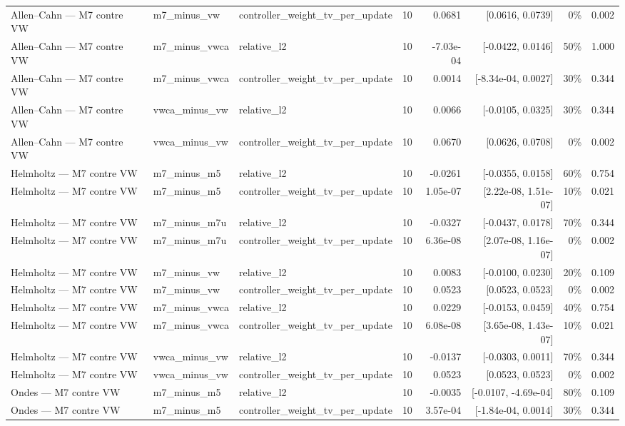 \begin{tabular}{llllrrrr}
Allen–Cahn — M7 contre VW & m7\_minus\_vw & controller\_weight\_tv\_per\_update & 10 & 0.0681 & [0.0616, 0.0739] & 0\% & 0.002 \\
Allen–Cahn — M7 contre VW & m7\_minus\_vwca & relative\_l2 & 10 & -7.03e-04 & [-0.0422, 0.0146] & 50\% & 1.000 \\
Allen–Cahn — M7 contre VW & m7\_minus\_vwca & controller\_weight\_tv\_per\_update & 10 & 0.0014 & [-8.34e-04, 0.0027] & 30\% & 0.344 \\
Allen–Cahn — M7 contre VW & vwca\_minus\_vw & relative\_l2 & 10 & 0.0066 & [-0.0105, 0.0325] & 30\% & 0.344 \\
Allen–Cahn — M7 contre VW & vwca\_minus\_vw & controller\_weight\_tv\_per\_update & 10 & 0.0670 & [0.0626, 0.0708] & 0\% & 0.002 \\
Helmholtz — M7 contre VW & m7\_minus\_m5 & relative\_l2 & 10 & -0.0261 & [-0.0355, 0.0158] & 60\% & 0.754 \\
Helmholtz — M7 contre VW & m7\_minus\_m5 & controller\_weight\_tv\_per\_update & 10 & 1.05e-07 & [2.22e-08, 1.51e-07] & 10\% & 0.021 \\
Helmholtz — M7 contre VW & m7\_minus\_m7u & relative\_l2 & 10 & -0.0327 & [-0.0437, 0.0178] & 70\% & 0.344 \\
Helmholtz — M7 contre VW & m7\_minus\_m7u & controller\_weight\_tv\_per\_update & 10 & 6.36e-08 & [2.07e-08, 1.16e-07] & 0\% & 0.002 \\
Helmholtz — M7 contre VW & m7\_minus\_vw & relative\_l2 & 10 & 0.0083 & [-0.0100, 0.0230] & 20\% & 0.109 \\
Helmholtz — M7 contre VW & m7\_minus\_vw & controller\_weight\_tv\_per\_update & 10 & 0.0523 & [0.0523, 0.0523] & 0\% & 0.002 \\
Helmholtz — M7 contre VW & m7\_minus\_vwca & relative\_l2 & 10 & 0.0229 & [-0.0153, 0.0459] & 40\% & 0.754 \\
Helmholtz — M7 contre VW & m7\_minus\_vwca & controller\_weight\_tv\_per\_update & 10 & 6.08e-08 & [3.65e-08, 1.43e-07] & 10\% & 0.021 \\
Helmholtz — M7 contre VW & vwca\_minus\_vw & relative\_l2 & 10 & -0.0137 & [-0.0303, 0.0011] & 70\% & 0.344 \\
Helmholtz — M7 contre VW & vwca\_minus\_vw & controller\_weight\_tv\_per\_update & 10 & 0.0523 & [0.0523, 0.0523] & 0\% & 0.002 \\
Ondes — M7 contre VW & m7\_minus\_m5 & relative\_l2 & 10 & -0.0035 & [-0.0107, -4.69e-04] & 80\% & 0.109 \\
Ondes — M7 contre VW & m7\_minus\_m5 & controller\_weight\_tv\_per\_update & 10 & 3.57e-04 & [-1.84e-04, 0.0014] & 30\% & 0.344 \\

\end{tabular}
